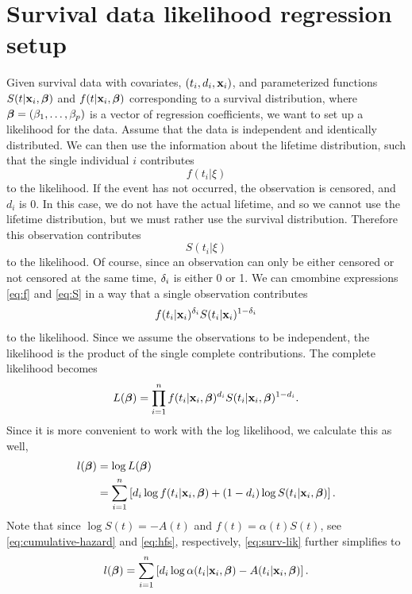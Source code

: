 \section{Survival data likelihood regression setup}
Given survival data with covariates, $(t_i,d_i,\mathbf{x}_i)$, and parameterized functions $S(t|\mathbf{x}_i,\boldsymbol{\beta})$ and $f(t|\mathbf{x}_i,\boldsymbol{\beta})$ corresponding to a survival distribution, where $\boldsymbol{\beta}=(\beta_1,\ldots,\beta_p)$ is a vector of regression coefficients, we want to set up a likelihood for the data. Assume that the data is independent and identically distributed. We can then use the information about the lifetime distribution, such that the single individual $i$ contributes
\begin{equation}\label{eq:f}
    f(t_i|\xi)
\end{equation}
to the likelihood. If the event has not occurred, the observation is censored, and $d_i$ is 0. In this case, we do not have the actual lifetime, and so we cannot use the lifetime distribution, but we must rather use the survival distribution. Therefore this observation contributes
\begin{equation}\label{eq:S}
    S(t_i|\xi)
\end{equation}
to the likelihood. Of course, since an observation can only be either censored or not censored at the same time, $\delta_{i}$ is either 0 or 1. We can cmombine expressions \eqref{eq:f} and \eqref{eq:S} in a way that a single observation contributes
\begin{equation*}
    f(t_{i}|\mathbf{x}_i)^{\delta_{i}}S(t_{i}|\mathbf{x}_i)^{1-\delta_{i}}
\end{equation*}
to the likelihood. Since we assume the observations to be independent, the likelihood is the product of the single complete contributions. The complete likelihood becomes
\begin{equation}\label{eq:surv-lik}
    L(\boldsymbol{\beta})=\prod_{i=1}^n f(t_i|\mathbf{x}_i,\boldsymbol{\beta})^{d_i} S(t_i|\mathbf{x}_i,\boldsymbol{\beta})^{1-d_i}.
\end{equation}
Since it is more convenient to work with the log likelihood, we calculate this as well,
\begin{align}\label{eq:surv-lik}
\begin{split}
    l(\boldsymbol{\beta})&=\log L(\boldsymbol{\beta}) \\
    &=\sum_{i=1}^n\left[ d_i \log f(t_i|\mathbf{x}_i,\boldsymbol{\beta}) + (1-d_i)\log S(t_i|\mathbf{x}_i,\boldsymbol{\beta})\right].
\end{split}
\end{align}
Note that since $\log S(t)=-A(t)$ and $f(t)=\alpha(t)S(t)$, see \eqref{eq:cumulative-hazard} and \eqref{eq:hfs}, respectively, \eqref{eq:surv-lik} further simplifies to
\begin{equation*}
    l(\boldsymbol{\beta})=\sum_{i=1}^n\left[ d_i \log \alpha(t_i|\mathbf{x}_i,\boldsymbol{\beta}) - A(t_i|\mathbf{x}_i,\boldsymbol{\beta})\right].
\end{equation*}

